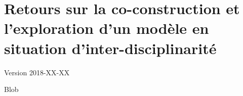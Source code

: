 \documentclass[12pt, a4paper, oneside]{book}
\begin{document}
	\setcounter{part}{2}
	\setcounter{chapter}{7}
	\setcounter{secnumdepth}{4}
	
	\chapter{Retours sur la co-construction et l'exploration d'un modèle en situation d'inter-disciplinarité}
	\begin{center}
		{\large Version 2018-XX-XX}
	\end{center}

\newpage
	
	Blob
	
\end{document}
